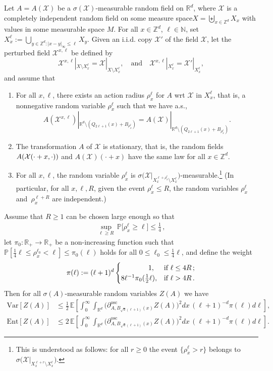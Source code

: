 \documentclass[AHL,Unicode,longabstracts]{cedram}
\newcommand{\N}{\mathbb N}
\newcommand{\R}{\mathbb R}
\newcommand{\Z}{\mathbb Z}
\newcommand{\expec}[1]{\mathbb{E}\left[#1 \right]}
\newcommand{\pr}[1]{\mathbb{P}\left[#1 \right]}
\newcommand{\prm}[1]{\mathbb{P}\big[#1 \big]}
\newcommand{\X}{\mathcal X}
\newcommand{\osc}{\partial^{\mathrm{osc}}}
\newcommand{\oscd}[1]{\mathrel{\osc_{#1}}}
\newcommand{\var}[1]{\mathrm{Var}\left[#1\right]}
\newcommand{\ent}[1]{\mathrm{Ent}\!\left[#1\right]}
\newcommand*{\alphenumi}{\renewcommand*{\theenumi}{\alph{enumi}}}
\begin{document}
\begin{theo}\label{th:ar-rpm}
Let $A=A(\X)$ be a $\sigma(\X)$-measurable random field on $\R^d$, where $\X$ is a completely independent random field on some measure space\linebreak$X=\biguplus_{x\in\Z^d}X_{x}$ with values in some measurable space $M$. For all $x\in\Z^d$, $\ell\in\N$, set $X_x^\ell:=\bigcup_{y\in\Z^d:|x-y|_\infty\le\ell}X_y$. Given an i.i.d. copy $\X'$ of the field $\X$, let the perturbed field $\X^{x,\ell}$ be defined by
\[
\X^{x,\ell}|_{X\setminus X_x^\ell}=\X|_{X\setminus X_x^\ell},\quad\text{and}\quad\X^{x,\ell}|_{X_x^\ell}=\X'|_{X_x^\ell},
\]
and assume that
\begin{enumerate}\alphenumi
\item \label{theo-2.8.1}For all $x,\ell$, there exists an action radius $\rho_x^\ell$ for $A$ wrt $\X$ in $X_x^\ell$, that is, a nonnegative random variable $\rho_x^\ell$ such that we have a.s.,
\[
A(\X^{x,\ell})|_{\R^d\setminus (Q_{2\ell+1}(x)+B_{\rho_x^\ell})}=A(\X)|_{\R^d\setminus (Q_{2\ell+1}(x)+B_{\rho_x^\ell})}.
\]
\item \label{theo-2.8.2}The transformation $A$ of $\X$ is stationary, that is, the random fields $A(\X\linebreak(\cdot+x,\cdot))$ and $A(\X)(\cdot+x)$ have the same law for all $x\in\Z^d$.
\item \label{theo-2.8.3}For all $x,\ell$, the random variable $\rho_x^\ell$ is $\sigma\Big(\X\big|_{X_x^{\ell+\rho_x^\ell}\setminus X_x^\ell}\Big)$-measurable.\footnote{This is understood as follows: for all $r\ge0$ the event $\{\rho_x^\ell>r\}$ belongs to $\sigma\Big(\X\big|_{X_x^{\ell+r}\setminus X_x^\ell}\Big)$.}
(In particular, for all $x,\ell,R$, given the event $\rho_x^\ell\le R$, the random variables $\rho_x^\ell$ and~$\rho_x^{\ell+R}$ are independent.)
\end{enumerate}
Assume that $R\ge1$ can be chosen large enough so that
\begin{align}\label{eq:choice-R}
\sup_{\ell\ge R}\,\prm{\rho_x^\ell\ge\ell}\le\tfrac14\,,
\end{align}
let $\pi_0:\R_+\to\R_+$ be a non-increasing function such that $\pr{\frac14\ell\le\rho_x^{\ell_0}<\ell}\le\pi_0(\ell)$ holds for all $0\le\ell_0\le\frac14\ell$, and define the weight 
\[
\pi(\ell):=(\ell+1)^{d}
\begin{cases}
\mkern70mu1,&\text{if }\ell\le 4R\,;\\8\ell^{-1}\pi_0(\frac12\ell),&\text{if }\ell>4R\,.
\end{cases}
\]
Then for all $\sigma(A)$-measurable random variables $Z(A)$ we have
\begin{align}
\var{Z(A)}&\le\frac12\,\expec{\int_0^\infty\int_{\R^d}{\Big(\oscd{A,B_{\sqrt d(\ell+1)}(x)}Z(A)\Big)^2}dx\,(\ell+1)^{-d}\pi(\ell) d\ell},\label{eq:AG-SG}
\\
\ent{Z(A)}&\le2\,\expec{\int_0^\infty\int_{\R^d}{\Big(\oscd{A,B_{\sqrt d(\ell+1)}(x)}Z(A)\Big)^2}dx\,(\ell+1)^{-d}\pi(\ell) d\ell}.\label{eq:AG-LSI}
\end{align}

\end{theo}
\end{document}
